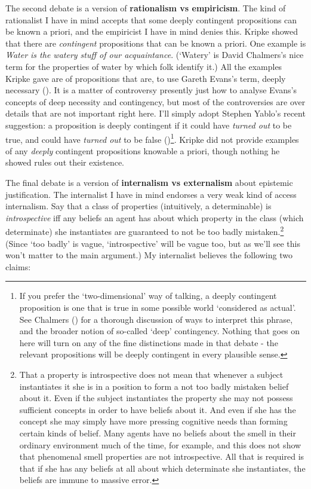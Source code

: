 \documentclass[
  11pt,
  letterpaper,
  DIV=11,
  numbers=noendperiod,
  twoside]{scrartcl}
\begin{document}
The second debate is a version of \textbf{rationalism vs empiricism}.
The kind of rationalist I have in mind accepts that some deeply
contingent propositions can be known a priori, and the empiricist I have
in mind denies this. Kripke showed that there are \emph{contingent}
propositions that can be known a priori. One example is \emph{Water is
the watery stuff of our acquaintance}. (`Watery' is David Chalmers's
nice term for the properties of water by which folk identify it.) All
the examples Kripke gave are of propositions that are, to use Gareth
Evans's term, deeply necessary ().
It is a matter of controversy presently just how to analyse Evans's
concepts of deep necessity and contingency, but most of the
controversies are over details that are not important right here. I'll
simply adopt Stephen Yablo's recent suggestion: a proposition is deeply
contingent if it could have \emph{turned out} to be true, and could have
\emph{turned out} to be false ()\footnote{If you prefer the `two-dimensional' way of talking, a
  deeply contingent proposition is one that is true in some possible
  world `considered as actual'. See Chalmers
  () for a thorough discussion of ways
  to interpret this phrase, and the broader notion of so-called `deep'
  contingency. Nothing that goes on here will turn on any of the fine
  distinctions made in that debate - the relevant propositions will be
  deeply contingent in every plausible sense.}. Kripke did not provide
examples of any \emph{deeply} contingent propositions knowable a priori,
though nothing he showed rules out their existence.

The final debate is a version of \textbf{internalism vs externalism}
about epistemic justification. The internalist I have in mind endorses a
very weak kind of access internalism. Say that a class of properties
(intuitively, a determinable) is \emph{introspective} iff any beliefs an
agent has about which property in the class (which determinate) she
instantiates are guaranteed to not be too badly mistaken.\footnote{That
  a property is introspective does not mean that whenever a subject
  instantiates it she is in a position to form a not too badly mistaken
  belief about it. Even if the subject instantiates the property she may
  not possess sufficient concepts in order to have beliefs about it. And
  even if she has the concept she may simply have more pressing
  cognitive needs than forming certain kinds of belief. Many agents have
  no beliefs about the smell in their ordinary environment much of the
  time, for example, and this does not show that phenomenal smell
  properties are not introspective. All that is required is that if she
  has any beliefs at all about which determinate she instantiates, the
  beliefs are immune to massive error.} (Since `too badly' is vague,
`introspective' will be vague too, but as we'll see this won't matter to
the main argument.) My internalist believes the following two claims:
\end{document}
